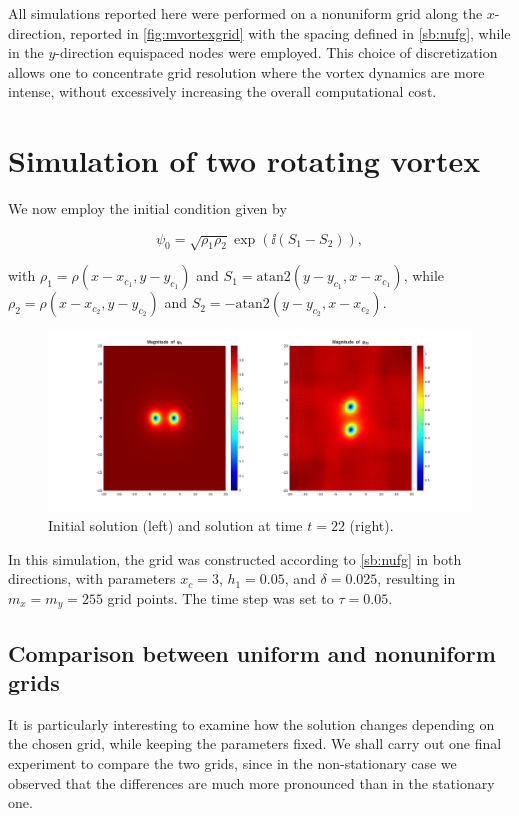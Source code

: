 All simulations reported here were performed on a nonuniform grid along the $x$-direction, reported in \ref{fig:mvortexgrid} with the spacing defined in \ref{sb:nufg}, while in the $y$-direction equispaced nodes were employed. This choice of discretization allows one to concentrate grid resolution where the vortex dynamics are more intense, without excessively increasing the overall computational cost.

\section{Simulation of two rotating vortex}

We now employ the initial condition given by 

\[
    \psi_0 = \sqrt{\rho_1 \rho_2}\exp\left(\ii (S_1 - S_2)\right),
\] 

with $\rho_1 = \rho(x - x_{c_1}, y - y_{c_1})$ and $S_1 = \mathrm{atan2}(y - y_{c_1}, x - x_{c_1})$, while $\rho_2 = \rho(x - x_{c_2}, y - y_{c_2})$ and $S_2 = -\mathrm{atan2}(y - y_{c_2}, x - x_{c_2})$.

\begin{figure}[H]
    \centering
    \includegraphics[width=\textwidth]{img/rotating.pdf}
    \caption{Initial solution (left) and solution at time $t = 22$ (right).}
\end{figure}

In this simulation, the grid was constructed according to \ref{sb:nufg} in both directions, with parameters $x_c = 3$, $h_1 = 0.05$, and $\delta = 0.025$, resulting in $m_x = m_y = 255$ grid points. The time step was set to $\tau = 0.05$.

\subsection{Comparison between uniform and nonuniform grids}

It is particularly interesting to examine how the solution changes depending on the chosen grid, while keeping the parameters fixed. We shall carry out one final experiment to compare the two grids, since in the non-stationary case we observed that the differences are much more pronounced than in the stationary one.

